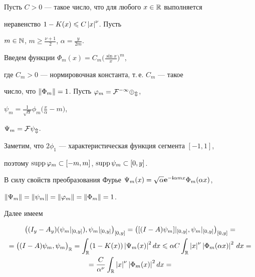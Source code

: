 \begin{pf}


Пусть $C>0$ --- такое число, что для любого $x\in\Bbb R$ выполняется 


неравенство $1-K(x)\leqslant C\abs{x}^{\nu}$. Пусть


$m\in\Bbb N$, $m\geqslant\frac{\nu+1}{2}$, $\alpha=\frac{y}{2 m}$. 


Введем функции $\Phi_{m}(x)=C_{m} \big(\frac{\sin x}{x} \big)^{m}$, 


где $C_{m}>0$ --- нормировочная константа, т.\,е. $C_{m}$ --- такое 


число, что $\norm{\Phi_{m}}=1$. Пусть $\phi_{m}=\cal F^{-1}\Phi_{m}$,


$\psi_{m}=\frac{1}{\sqrt{\alpha}}\phi_{m} \big(\frac{x}{\alpha}-m \big)$,


$\Psi_{m}=\cal F\psi_{m}$.





Заметим, что $2\phi_{1}$ --- характеристическая функция сегмента $[-1,1]$, 


поэтому $\supp\phi_{m}\subset[-m,m]$, $\supp \psi_{m}\subset[0,y]$. 


В силу свойств преобразования Фурье $\Psi_{m}(x)=\sqrt{\alpha}


\bold e^{-\bold i \alpha m x}\Phi_{m}(\alpha x)$,


$\norm{\Psi_{m}}=\norm{\psi_{m}}=\norm{\phi_{m}}=\norm{\Phi_{m}}=1$.





Далее имеем


\begin{multline*}


\big((I_{y}-A_{y}) (\psi_{m}|_{[0,y]} ), \psi_{m}|_{[0,y]}\big)_{[0,y]}=


\big([(I-A)\psi_{m}]|_{[0,y]}, \psi_{m}|_{[0,y]} \big)_{[0,y]}=\\


%


=\big((I-A)\psi_{m}, \psi_{m} \big)_{\Bbb R}=


\int_{\Bbb R} (1-K(x))\abs{\Psi_{m}(x)}^{2}dx\leqslant


\alpha C \int_{\Bbb R}\abs{x}^{\nu}\abs{\Phi_{m}(\alpha x)}^{2}\,dx=\\


%


=\frac{C}{\alpha^{\nu}}


\int_{\Bbb R}\abs{x}^{\nu}\abs{\Phi_{m}(x)}^{2}dx=



\end{multline*}
\end{pf}
